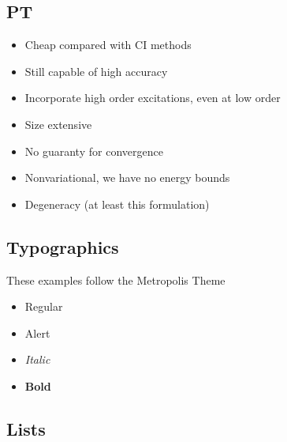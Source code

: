 \documentclass[
11pt,notheorems,hyperref={pdfauthor=whatever}
]{beamer}
\begin{document}
\subsection{PT}
\begin{frame}
    \textcolor{Green}{}
    \begin{itemize}
        \item Cheap compared with CI methods 
        \item Still capable of high accuracy
        \item Incorporate high order excitations, even at low order  
        \item Size extensive 
    \end{itemize}
    \vspace{20px}
    \textcolor{Red}{}
    \begin{itemize}
        \item No guaranty for convergence
        \item Nonvariational, we have no energy bounds  
        \item Degeneracy (at least this formulation)
    \end{itemize}
\end{frame}

\subsection{Typographics}
\begin{frame}
    These examples follow the Metropolis Theme
    \begin{itemize}
        \item Regular
        \item \alert{Alert}
        \item \textit{Italic}
        \item \textbf{Bold}
    \end{itemize}
\end{frame}

\subsection{Lists}
\end{document}
